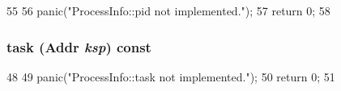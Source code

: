 \begin{DoxyCode}
55 {
56     panic("ProcessInfo::pid not implemented.\n");
57     return 0;
58 }
\end{DoxyCode}
\hypertarget{classPowerISA_1_1ProcessInfo_a05de971c556b8e4418a60289f92dfba3}{
\subsubsection[{task}]{ task ({\bf Addr} {\em ksp}) const}}
\label{classPowerISA_1_1ProcessInfo_a05de971c556b8e4418a60289f92dfba3}



\begin{DoxyCode}
48 {
49     panic("ProcessInfo::task not implemented.\n");
50     return 0;
51 }
\end{DoxyCode}


